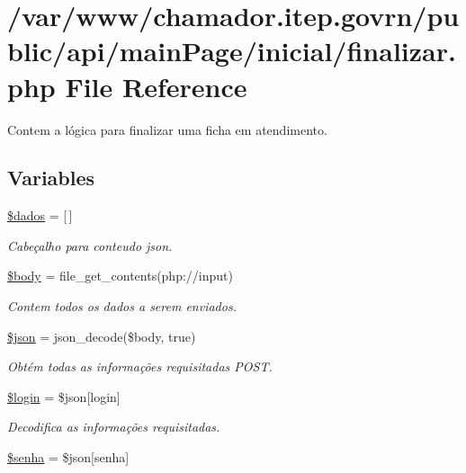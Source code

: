 \hypertarget{finalizar_8php}{}\section{/var/www/chamador.itep.\+govrn/public/api/main\+Page/inicial/finalizar.php File Reference}
\label{finalizar_8php}


Contem a lógica para finalizar uma ficha em atendimento.  


\subsection*{Variables}
\begin{DoxyCompactItemize}
\item 
\hyperlink{finalizar_8php_a252370d95039a38fa11afab784725d58}{\$dados} = \mbox{[}$\,$\mbox{]}
\begin{DoxyCompactList}\small\item\em Cabeçalho para conteudo json. \end{DoxyCompactList}\item 
\hyperlink{finalizar_8php_a26b9f9373f7bb79dfcf8a86dff086b45}{\$body} = file\+\_\+get\+\_\+contents(\textquotesingle{}php\+://input\textquotesingle{})
\begin{DoxyCompactList}\small\item\em Contem todos os dados a serem enviados. \end{DoxyCompactList}\item 
\hyperlink{finalizar_8php_acedd13b51401130848ce18f4d5c52605}{\$json} = json\+\_\+decode(\$body, true)
\begin{DoxyCompactList}\small\item\em Obtém todas as informações requisitadas P\+O\+ST. \end{DoxyCompactList}\item 
\hyperlink{finalizar_8php_afc31993e855f9631572adfedcfe6f34b}{\$login} = \$json\mbox{[}\textquotesingle{}login\textquotesingle{}\mbox{]}
\begin{DoxyCompactList}\small\item\em Decodifica as informações requisitadas. \end{DoxyCompactList}\item 
\hyperlink{finalizar_8php_a3678c8769c9698fd30581c1016c5f475}{\$senha} = \$json\mbox{[}\textquotesingle{}senha\textquotesingle{}\mbox{]}

\end{DoxyCompactItemize}
